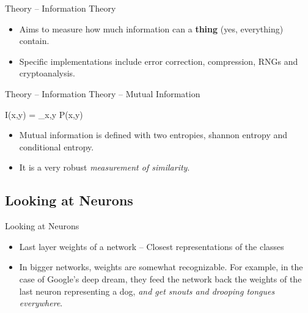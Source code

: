 \documentclass{beamer}
\begin{document}
\begin{frame}{Theory -- Information Theory}
  \begin{itemize}
  \item {
    Aims to measure how much information can a \textbf{thing} (yes, everything) contain.
  }
  \item {
    Specific implementations include error correction, \alert{compression}, RNGs and cryptoanalysis.
  }
  \end{itemize}
\end{frame}

\begin{frame}{Theory -- Information Theory -- Mutual Information}
  \centering
    \begin{Mutual information is a way to measure how similar two samples of data are.}
        I(x,y) = \sum_{x,y} P(x,y) 
    \end{Mutual information is a way to measure how similar two samples of data are.}
    
  \begin{itemize}
    
    \item {
        \alert{Mutual information} is defined with two entropies, shannon entropy and conditional entropy.
    }
    
    \item {
        It is a very robust \textit{measurement of similarity}.
    }

  \end{itemize}
\end{frame}

\subsection{Looking at Neurons}

\begin{frame}{Looking at Neurons}
  \begin{itemize}
  \item {
    Last layer weights of a network -- Closest representations of the classes
  }
  \item {
    In bigger networks, \alert{weights are somewhat recognizable}. For example, in the case of Google's deep dream, they feed the network back the weights of the last neuron representing a dog, \textit{and get snouts and drooping tongues everywhere}.
  }
  \end{itemize}
\end{frame}
\end{document}
